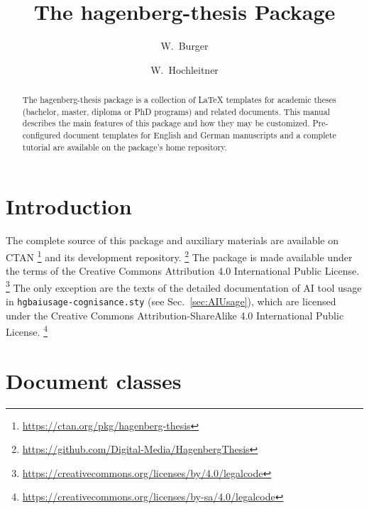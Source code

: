 \documentclass[language=english]{hgbarticle}
\begin{document}

\title{The \textsf{hagenberg-thesis} Package}
\date{\hgbDate}

\author{W.\ Burger}
\author{W.\ Hochleitner}

\maketitle

\begin{abstract}\noindent
The \textsf{hagenberg-thesis} package is a collection of LaTeX
templates for academic theses (bachelor, master, diploma or PhD programs) and
related documents. This manual describes the main features of this package
and how they may be customized.
Pre-configured document templates for English and German manuscripts and a
complete tutorial are available on the package's home repository.
\end{abstract}

\clearpage
\tableofcontents
\clearpage

\section{Introduction}

\makeatletter
\AB@authors
\makeatother

The complete source of this package and auxiliary materials are available on
CTAN%
\footnote{\url{https://ctan.org/pkg/hagenberg-thesis}}
and its development repository.%
\footnote{\url{https://github.com/Digital-Media/HagenbergThesis}}
The package is made available under the terms of the Creative Commons
Attribution 4.0 International Public License.%
\footnote{\url{https://creativecommons.org/licenses/by/4.0/legalcode}}
The only exception are the texts of the detailed documentation of AI tool usage in
\texttt{hgbaiusage-cognisance.sty} (see Sec.~\ref{sec:AIUsage}), which are licensed under the
Creative Commons Attribution-ShareAlike 4.0 International Public License.%
\footnote{\url{https://creativecommons.org/licenses/by-sa/4.0/legalcode}}


\section{Document classes}
\end{document}
